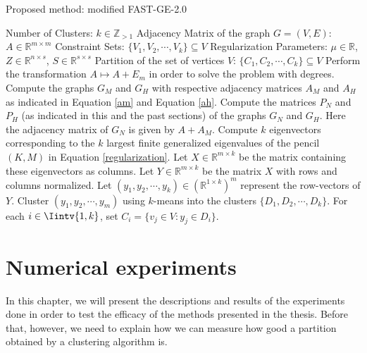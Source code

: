 \begin{algorithm}
\caption{Proposed method: modified FAST-GE-2.0}\label{proposed_algorithm}
\begin{algorithmic}[1]
   \Require 
      \Statex Number of Clusters: $k \in \mathbb Z_{>1}$
      \Statex Adjacency Matrix of the graph $G=(V,E)$: $A \in \mathbb R ^ {m \times m}$ 
      \Statex Constraint Sets: $\{ V_1, V_2, \cdots, V_k \} \subseteq V$
      \Statex Regularization Parameters: $\mu \in \mathbb R$, $Z \in \mathbb R ^{n \times s}$, $S \in \mathbb R ^{s \times s}$
   \Ensure 
      \Statex Partition of the set of vertices $V$: $\{ C_1, C_2, \cdots, C_k \} \subseteq V$
      \vspace{0.2 cm}
   \State Perform the transformation $A \longmapsto A + E_m$ in order to solve the problem with degrees.
   \State Compute the graphs $G_M$ and $G_H$ with respective adjacency matrices $A_M$ and $A_H$ as indicated in Equation \vref{am} and Equation \vref{ah}.
   \State Compute the matrices $P_N$ and $P_H$ (as indicated in this and the past sections) of the graphs $G_N$ and $G_H$. Here the adjacency matrix of $G_N$ is given by $A + A_M$.
   \State Compute $k$ eigenvectors corresponding to the $k$ largest finite generalized eigenvalues of the pencil $(K,M)$ in Equation \vref{regularization}. Let $X \in \mathbb R ^{m \times k}$ be the matrix containing these eigenvectors as columns.
   \State Let $Y \in \mathbb R ^{m \times k}$ be the matrix $X$ with rows and columns normalized.
   \State Let $(y_1, y_2, \cdots, y_k) \in (\mathbb R^{1 \times k})^m$ represent the row-vectors of $Y$.
   \State Cluster $(y_1, y_2, \cdots, y_m)$ using $k$-means into the clusters $ \{ D_1, D_2, \cdots, D_k \}$.
   \State For each $i \in \Iintv{1,k}$, set $C_i = \{ v_j \in V: y_j \in D_i \}$.
\end{algorithmic}
\end{algorithm}



\chapter{Numerical experiments} \label{numexp}
In this chapter, we will present the descriptions and results of the experiments done in order to test the efficacy of the methods presented in the thesis. 
Before that, however, we need to explain how we can measure how good a partition obtained by a clustering algorithm is.

